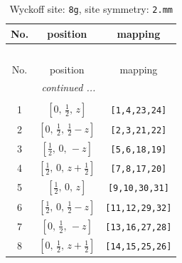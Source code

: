 \documentclass[fleqn,8pt]{jsarticle}
\begin{document}
\begin{longtable}{ccc}
\caption{Wyckoff site: {\tt 8g}, site symmetry: {\tt 2.mm}}
 \\
 \hline \hline
No. & position & mapping \\ \hline \endfirsthead

\multicolumn{2}{l}{\tablename\ \thetable{}} \\
 \hline \hline
No. & position & mapping \\ \hline \endhead

 \hline \hline
\multicolumn{2}{r}{\footnotesize\it continued ...} \\ \endfoot

 \hline \hline
\multicolumn{2}{r}{} \\ \endlastfoot

1 & $\left[ 0,\, \frac{1}{2},\, z \right]$ & {\tt [1,4,23,24]} \\ \hline
2 & $\left[ 0,\, \frac{1}{2},\, \frac{1}{2} - z \right]$ & {\tt [2,3,21,22]} \\ \hline
3 & $\left[ \frac{1}{2},\, 0,\, - z \right]$ & {\tt [5,6,18,19]} \\ \hline
4 & $\left[ \frac{1}{2},\, 0,\, z + \frac{1}{2} \right]$ & {\tt [7,8,17,20]} \\ \hline
5 & $\left[ \frac{1}{2},\, 0,\, z \right]$ & {\tt [9,10,30,31]} \\ \hline
6 & $\left[ \frac{1}{2},\, 0,\, \frac{1}{2} - z \right]$ & {\tt [11,12,29,32]} \\ \hline
7 & $\left[ 0,\, \frac{1}{2},\, - z \right]$ & {\tt [13,16,27,28]} \\ \hline
8 & $\left[ 0,\, \frac{1}{2},\, z + \frac{1}{2} \right]$ & {\tt [14,15,25,26]} \\
\end{longtable}
\renewcommand{\arraystretch}{1.2}
\end{document}
